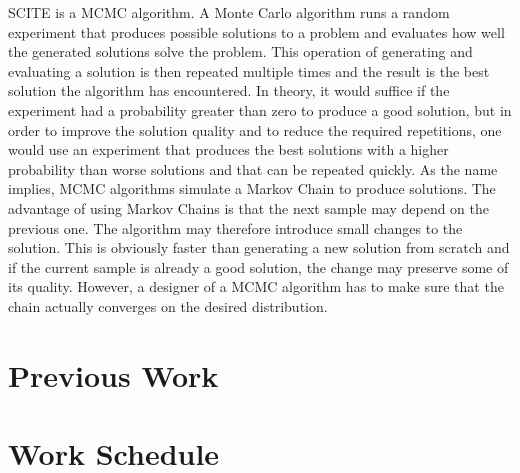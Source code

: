 \ac{SCITE} is a \ac{MCMC} algorithm. A Monte Carlo algorithm runs a random experiment that produces possible solutions to a problem and evaluates how well the generated solutions solve the problem. This operation of generating and evaluating a solution is then repeated multiple times and the result is the best solution the algorithm has encountered. In theory, it would suffice if the experiment had a probability greater than zero to produce a good solution, but in order to improve the solution quality and to reduce the required repetitions, one would use an experiment that produces the best solutions with a higher probability than worse solutions and that can be repeated quickly. As the name implies, \ac{MCMC} algorithms simulate a Markov Chain to produce solutions. The advantage of using Markov Chains is that the next sample may depend on the previous one. The algorithm may therefore introduce small changes to the solution. This is obviously faster than generating a new solution from scratch and if the current sample is already a good solution, the change may preserve some of its quality. However, a designer of a \ac{MCMC} algorithm has to make sure that the chain actually converges on the desired distribution.

\section{Previous Work}

\section{Work Schedule}